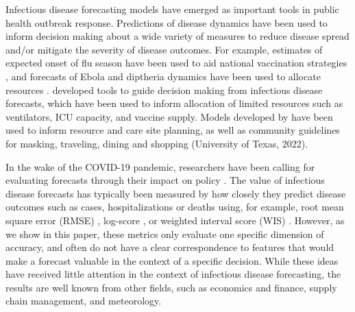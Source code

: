 \documentclass{article}\usepackage[]{graphicx}\usepackage[]{xcolor}
\begin{document}
Infectious disease forecasting models have emerged as important tools in public health outbreak response. Predictions of disease dynamics have been used to inform decision making about a wide variety of measures to reduce disease spread and/or mitigate the severity of disease outcomes. For example, estimates of expected onset of flu season have been used to aid national vaccination strategies \citep{igboh2023timing}, and forecasts of Ebola and diptheria dynamics have been used to allocate resources \citep{meltzer2014estimating, rainisch2015regional,camacho2015-ebola-bed,finger_real-time_2019}. \cite{bertsimas2021predictionsCOVID} developed tools to guide decision making from infectious disease forecasts, which have been used to inform allocation of limited resources such as ventilators, ICU capacity, and vaccine supply. Models developed by \cite{fox_real-time_2022} have been used to inform resource and care site planning, as well as community guidelines for masking, traveling, dining and shopping (University of Texas, 2022)\nocite{utnews2022}.

In the wake of the COVID-19 pandemic, researchers have been calling for evaluating forecasts through their impact on policy \citep{marshall2023predictions, bilinski_adaptive_2023}.
The value of infectious disease forecasts has typically been measured by how closely they predict disease outcomes such as cases, hospitalizations or deaths using, for example, root mean square error (RMSE) \citep{papastefanopoulos2020covid}, log-score \citep{mcgowan_collaborative_2019}, or weighted interval score (WIS) \citep{bracher2021evaluating}.
However, as we show in this paper, these metrics only evaluate one specific dimension of accuracy, and often do not have a clear correspondence to features that would make a forecast valuable in the context of a specific decision.
While these ideas have received little attention in the context of infectious disease forecasting, the results are well known from other fields, such as economics and finance, supply chain management, and meteorology.
\end{document}
